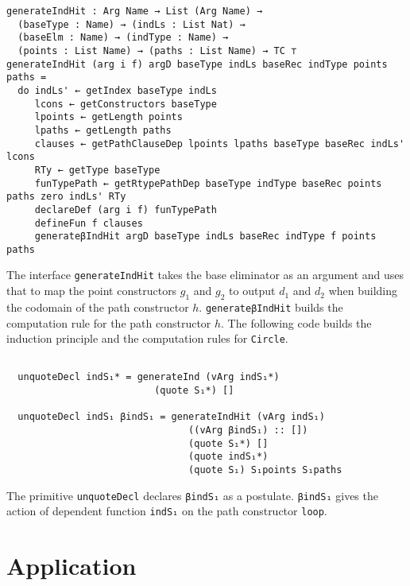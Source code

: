 \documentclass[sigplan,10pt]{acmart}
\begin{document}
\begin{center}
\begingroup
\fontsize{7pt}{9pt}\selectfont
\begin{Verbatim}
generateIndHit : Arg Name → List (Arg Name) →
  (baseType : Name) → (indLs : List Nat) →
  (baseElm : Name) → (indType : Name) →
  (points : List Name) → (paths : List Name) → TC ⊤
generateIndHit (arg i f) argD baseType indLs baseRec indType points paths =
  do indLs' ← getIndex baseType indLs
     lcons ← getConstructors baseType
     lpoints ← getLength points
     lpaths ← getLength paths
     clauses ← getPathClauseDep lpoints lpaths baseType baseRec indLs' lcons
     RTy ← getType baseType
     funTypePath ← getRtypePathDep baseType indType baseRec points paths zero indLs' RTy
     declareDef (arg i f) funTypePath
     defineFun f clauses
     generateβIndHit argD baseType indLs baseRec indType f points paths
\end{Verbatim}
\endgroup
\end{center}

The interface {\tt generateIndHit} takes the base eliminator as an argument and uses that to map the point constructors $g_1$ and $g_2$ to output $d_1$ and $d_2$ when building the codomain of the path constructor $h$. {\tt generateβIndHit} builds the computation rule for the path constructor $h$. The following code builds the induction principle and the computation rules for {\tt Circle}.

\begin{center}
\begingroup
\fontsize{8pt}{9pt}\selectfont
\begin{Verbatim}

  unquoteDecl indS₁* = generateInd (vArg indS₁*)
                          (quote S₁*) []

  unquoteDecl indS₁ βindS₁ = generateIndHit (vArg indS₁)
                                ((vArg βindS₁) :: [])
                                (quote S₁*) []
                                (quote indS₁*)
                                (quote S₁) S₁points S₁paths

\end{Verbatim}
\endgroup
\end{center}

The primitive {\tt unquoteDecl} declares {\tt βindS₁} as a postulate. {\tt βindS₁} gives the action of dependent function {\tt indS₁} on the path constructor {\tt loop}.

\section{Application}
\end{document}
